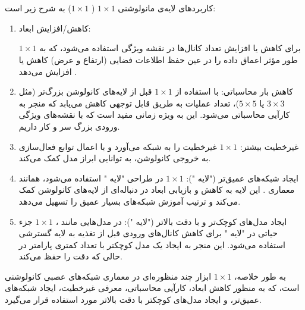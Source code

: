\documentclass{article}
\begin{document}
\section{}
کاربردهای لایه‌ی مانولوشنی $1\times1$ ( $1\times1$) به شرح زیر است:
\begin{enumerate}

\item    کاهش/افزایش ابعاد:

         $1\times1$ برای کاهش یا افزایش تعداد کانال‌ها در نقشه ویژگی استفاده می‌شود، که به طور مؤثر اعماق داده را در عین حفظ اطلاعات فضایی (ارتفاع و عرض) کاهش یا افزایش می‌دهد .

\item    کاهش بار محاسباتی:
        با استفاده از  $1\times1$ قبل از لایه‌های کانولوشن بزرگ‌تر (مثل $3\times3$ یا $5\times5$)، تعداد عملیات به طریق قابل توجهی کاهش می‌یابد که منجر به کارآیی محاسباتی می‌شود. این به ویژه زمانی مفید است که با نقشه‌های ویژگی ورودی بزرگ سر و کار داریم.

\item    غیرخطیت بیشتر:
         $1\times1$ غیرخطیت را به شبکه می‌آورد و با اعمال توابع فعال‌سازی به خروجی کانولوشن، به توانایی ابراز مدل کمک می‌کند.

\item    ایجاد شبکه‌های عمیق‌تر ("لایه "):
         $1\times1$ در طراحی "لایه " استفاده می‌شود، همانند معماری . این لایه به کاهش و بازیابی ابعاد در دنباله‌ای از لایه‌های کانولوشن کمک می‌کند و ترتیب آموزش شبکه‌های بسیار عمیق را تسهیل می‌دهد.

\item    ایجاد مدل‌های کوچک‌تر و با دقت بالاتر ("لایه "):
        در مدل‌هایی مانند ،  $1\times1$ جزء حیاتی در "لایه " برای کاهش کانال‌های ورودی قبل از تغذیه به لایه گسترشی استفاده می‌شود. این منجر به ایجاد یک مدل کوچکتر با تعداد کمتری پارامتر در حالی که دقت را حفظ می‌کند.
\end{enumerate}
به طور خلاصه،  $1\times1$ ابزار چند منظوره‌ای در معماری شبکه‌های عصبی کانولوشنی است، که به منظور کاهش ابعاد، کارآیی محاسباتی، معرفی غیرخطیت، ایجاد شبکه‌های عمیق‌تر، و ایجاد مدل‌های کوچکتر با دقت بالاتر مورد استفاده قرار می‌گیرد.

\end{document}
